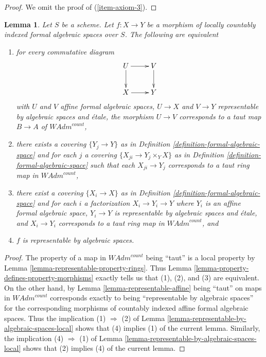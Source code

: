 \documentclass{stacks-project}
\theoremstyle{plain}
\newtheorem{lemma}[subsection]{Lemma}
\theoremstyle{definition}
\theoremstyle{remark}
\numberwithin{equation}{subsection}
\begin{document}
\begin{proof}
\medskip\noindent
We omit the proof of (\ref{item-axiom-3}).
\end{proof}

\begin{lemma}
\label{lemma-representable-local-property}
Let $S$ be a scheme. Let $f : X \to Y$ be a morphism of
locally countably indexed formal algebraic spaces over $S$.
The following are equivalent
\begin{enumerate}
\item for every commutative diagram
$$
\xymatrix{
U \ar[d] \ar[r] & V \ar[d] \\
X \ar[r] & Y
}
$$
with $U$ and $V$ affine formal algebraic spaces, $U \to X$ and $V \to Y$
representable by algebraic spaces and \'etale, the morphism $U \to V$
corresponds to a taut map $B \to A$ of $\textit{WAdm}^{count}$,
\item there exists a covering $\{Y_j \to Y\}$ as in
Definition \ref{definition-formal-algebraic-space} and for each $j$
a covering $\{X_{ji} \to Y_j \times_Y X\}$ as in
Definition \ref{definition-formal-algebraic-space}
such that each $X_{ji} \to Y_j$  corresponds
to a taut ring map in $\textit{WAdm}^{count}$,
\item there exist a covering $\{X_i \to X\}$ as in
Definition \ref{definition-formal-algebraic-space}
and for each $i$ a factorization $X_i \to Y_i \to Y$ where $Y_i$
is an affine formal algebraic space, $Y_i \to Y$ is representable
by algebraic spaces and \'etale, and $X_i \to Y_i$ corresponds
to a taut ring map in $\textit{WAdm}^{count}$, and
\item $f$ is representable by algebraic spaces.
\end{enumerate}
\end{lemma}

\begin{proof}
The property of a map in $\textit{WAdm}^{count}$ being
``taut'' is a local property by
Lemma \ref{lemma-representable-property-rings}.
Thus Lemma \ref{lemma-property-defines-property-morphisms}
exactly tells us that (1), (2), and (3) are equivalent.
On the other hand, by Lemma \ref{lemma-representable-affine}
being ``taut'' on maps in $\textit{WAdm}^{count}$ corresponds exactly to being
``representable by algebraic spaces'' for the corresponding morphisms of
countably indexed affine formal algebraic spaces.
Thus the implication (1) $\Rightarrow$ (2) of
Lemma \ref{lemma-representable-by-algebraic-spaces-local}
shows that (4) implies (1) of the current lemma.
Similarly, the implication (4) $\Rightarrow$ (1) of
Lemma \ref{lemma-representable-by-algebraic-spaces-local}
shows that (2) implies (4) of the current lemma.
\end{proof}
\end{document}
